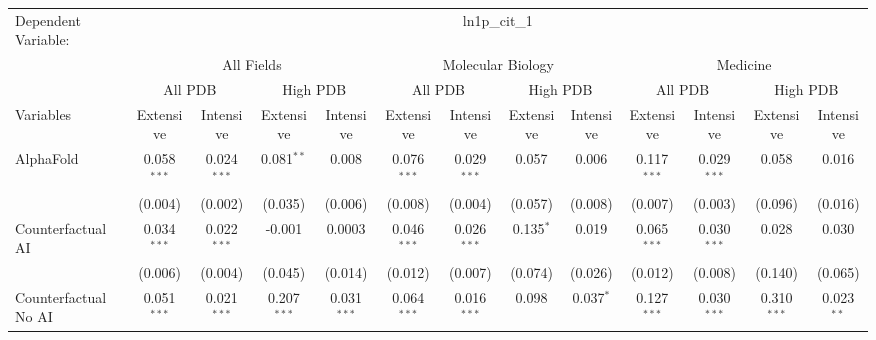 \begingroup
\centering
\begin{tabular}{lcccccccccccc}
   \tabularnewline \midrule \midrule
   Dependent Variable: & \multicolumn{12}{c}{ln1p\_cit\_1}\\
 & \multicolumn{4}{c}{All Fields} & \multicolumn{4}{c}{Molecular Biology} & \multicolumn{4}{c}{Medicine} \\
\cmidrule(lr){2-5} \cmidrule(lr){6-9} \cmidrule(lr){10-13}
 & \multicolumn{2}{c}{All PDB} & \multicolumn{2}{c}{High PDB} & \multicolumn{2}{c}{All PDB} & \multicolumn{2}{c}{High PDB} & \multicolumn{2}{c}{All PDB} & \multicolumn{2}{c}{High PDB} \\
\cmidrule(lr){2-3} \cmidrule(lr){4-5} \cmidrule(lr){6-7} \cmidrule(lr){8-9} \cmidrule(lr){10-11} \cmidrule(lr){12-13}
Variables & \multicolumn{1}{c}{Extensive} & \multicolumn{1}{c}{Intensive} & \multicolumn{1}{c}{Extensive} & \multicolumn{1}{c}{Intensive} & \multicolumn{1}{c}{Extensive} & \multicolumn{1}{c}{Intensive} & \multicolumn{1}{c}{Extensive} & \multicolumn{1}{c}{Intensive} & \multicolumn{1}{c}{Extensive} & \multicolumn{1}{c}{Intensive} & \multicolumn{1}{c}{Extensive} & \multicolumn{1}{c}{Intensive} \\
\cmidrule(lr){1-1}\cmidrule(lr){2-2} \cmidrule(lr){3-3} \cmidrule(lr){4-4} \cmidrule(lr){5-5} \cmidrule(lr){6-6} \cmidrule(lr){7-7} \cmidrule(lr){8-8} \cmidrule(lr){9-9} \cmidrule(lr){10-10} \cmidrule(lr){11-11} \cmidrule(lr){12-12} \cmidrule(lr){13-13}
   AlphaFold                                & 0.058$^{***}$ & 0.024$^{***}$   & 0.081$^{**}$  & 0.008          & 0.076$^{***}$ & 0.029$^{***}$   & 0.057       & 0.006          & 0.117$^{***}$ & 0.029$^{***}$  & 0.058         & 0.016\\   
                                            & (0.004)       & (0.002)         & (0.035)       & (0.006)        & (0.008)       & (0.004)         & (0.057)     & (0.008)        & (0.007)       & (0.003)        & (0.096)       & (0.016)\\   
   Counterfactual AI                        & 0.034$^{***}$ & 0.022$^{***}$   & -0.001        & 0.0003         & 0.046$^{***}$ & 0.026$^{***}$   & 0.135$^{*}$ & 0.019          & 0.065$^{***}$ & 0.030$^{***}$  & 0.028         & 0.030\\   
                                            & (0.006)       & (0.004)         & (0.045)       & (0.014)        & (0.012)       & (0.007)         & (0.074)     & (0.026)        & (0.012)       & (0.008)        & (0.140)       & (0.065)\\   
   Counterfactual No AI                     & 0.051$^{***}$ & 0.021$^{***}$   & 0.207$^{***}$ & 0.031$^{***}$  & 0.064$^{***}$ & 0.016$^{***}$   & 0.098       & 0.037$^{*}$    & 0.127$^{***}$ & 0.030$^{***}$  & 0.310$^{***}$ & 0.023$^{**}$\\   

\end{tabular}
